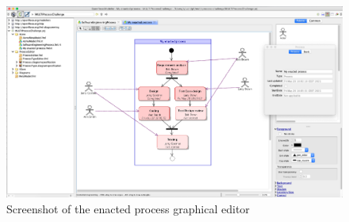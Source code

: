 \begin{figure}
 \centering
     \includegraphics[width=1.0 \textwidth]{Figures/ScreenshotEnactedProcessEditor.png}
     \caption{Screenshot of the enacted process graphical editor}
    \label{fig:ScreenshotEnactedProcessEditor}
\end{figure}




